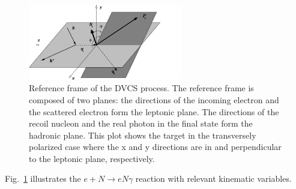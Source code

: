 \begin{figure}[!ht]
 \begin{center}
  \includegraphics[width=0.6\textwidth]{./figures/refdvcs.pdf}
   \caption[Reference frame of the DVCS process]{\footnotesize{Reference frame of the DVCS process. The reference frame is composed of two planes: the directions of the incoming electron and the scattered electron form the leptonic plane. The directions of the recoil nucleon and the real photon in the final state form the hadronic plane. This plot shows the target in the transversely polarized case where the x and y directions are in and perpendicular to the leptonic plane, respectively.}}
  \label{dvcs_ref}
 \end{center}
\end{figure}
Fig.~\ref{dvcs_ref} illustrates the $e+N\rightarrow eN\gamma$ reaction with relevant kinematic variables.


